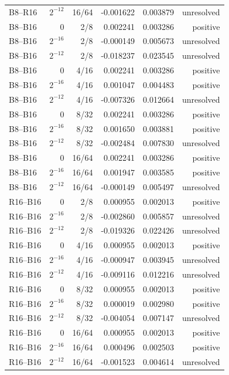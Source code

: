 {\begin{longtable}{lrrrrr}
B8--R16 & $2^{-12}$ & 16/64 & -0.001622 & 0.003879 & unresolved \\
B8--B16 & $0$ & 2/8 & 0.002241 & 0.003286 & positive \\
B8--B16 & $2^{-16}$ & 2/8 & -0.000149 & 0.005673 & unresolved \\
B8--B16 & $2^{-12}$ & 2/8 & -0.018237 & 0.023545 & unresolved \\
B8--B16 & $0$ & 4/16 & 0.002241 & 0.003286 & positive \\
B8--B16 & $2^{-16}$ & 4/16 & 0.001047 & 0.004483 & positive \\
B8--B16 & $2^{-12}$ & 4/16 & -0.007326 & 0.012664 & unresolved \\
B8--B16 & $0$ & 8/32 & 0.002241 & 0.003286 & positive \\
B8--B16 & $2^{-16}$ & 8/32 & 0.001650 & 0.003881 & positive \\
B8--B16 & $2^{-12}$ & 8/32 & -0.002484 & 0.007830 & unresolved \\
B8--B16 & $0$ & 16/64 & 0.002241 & 0.003286 & positive \\
B8--B16 & $2^{-16}$ & 16/64 & 0.001947 & 0.003585 & positive \\
B8--B16 & $2^{-12}$ & 16/64 & -0.000149 & 0.005497 & unresolved \\
R16--B16 & $0$ & 2/8 & 0.000955 & 0.002013 & positive \\
R16--B16 & $2^{-16}$ & 2/8 & -0.002860 & 0.005857 & unresolved \\
R16--B16 & $2^{-12}$ & 2/8 & -0.019326 & 0.022426 & unresolved \\
R16--B16 & $0$ & 4/16 & 0.000955 & 0.002013 & positive \\
R16--B16 & $2^{-16}$ & 4/16 & -0.000947 & 0.003945 & unresolved \\
R16--B16 & $2^{-12}$ & 4/16 & -0.009116 & 0.012216 & unresolved \\
R16--B16 & $0$ & 8/32 & 0.000955 & 0.002013 & positive \\
R16--B16 & $2^{-16}$ & 8/32 & 0.000019 & 0.002980 & positive \\
R16--B16 & $2^{-12}$ & 8/32 & -0.004054 & 0.007147 & unresolved \\
R16--B16 & $0$ & 16/64 & 0.000955 & 0.002013 & positive \\
R16--B16 & $2^{-16}$ & 16/64 & 0.000496 & 0.002503 & positive \\
R16--B16 & $2^{-12}$ & 16/64 & -0.001523 & 0.004614 & unresolved \\
\hline\end{longtable}}
